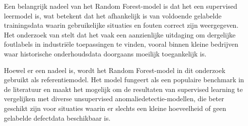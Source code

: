 {{{{Een belangrijk nadeel van het Random Forest-model is dat het een supervised leermodel is, wat betekent dat het afhankelijk is van voldoende gelabelde trainingsdata waarin gebruikelijke situaties en fouten correct zijn weergegeven. Het onderzoek van \textcite{Elahi2023} stelt dat het vaak een aanzienlijke uitdaging om dergelijke foutlabels in industriële toepassingen te vinden, vooral binnen kleine bedrijven waar historische onderhoudsdata doorgaans moeilijk toegankelijk is.

Hoewel er een nadeel is, wordt het Random Forest-model in dit onderzoek gebruikt als referentiemodel. Het model fungeert als een populaire benchmark in de literatuur en maakt het mogelijk om de resultaten van supervised learning te vergelijken met diverse unsupervised anomaliedetectie-modellen, die beter geschikt zijn voor situaties waarin er slechts een kleine hoeveelheid of geen gelabelde defectdata beschikbaar is.
    

\section{}%
\label{sec:{Isolation Forest-model}

Het Isolation Forest-model is een unsupervised machine learning-algoritme dat speciaal is ontworpen voor het opsporen van afwijkingen. In tegenstelling tot supervised modellen heeft het Isolation Forest-model tijdens de training geen gelabelde fouten nodig. Het algoritme veronderstelt dat afwijkende observaties eenvoudiger kunnen worden geïsoleerd dan gebruikelijke observaties. Volgens het onderzoek van \textcite{Carvalho2019} moet er voor dit doel willekeurige beslissingsbomen gevormd worden, waarbij afwijkingen meestal met minder splitsingen worden gerealiseerd dan gebruikelijke datapunten.

}}}}}
